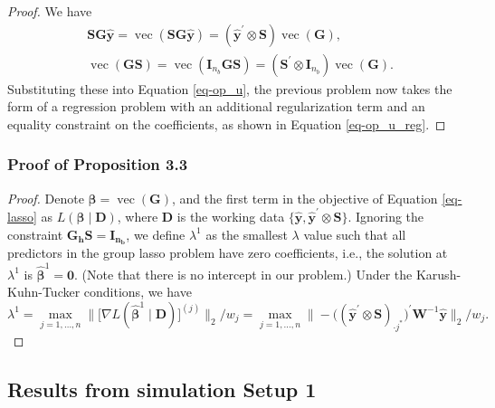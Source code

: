 \documentclass[
  11pt]{article}
\theoremstyle{plain}
\theoremstyle{remark}
\begin{document}
\begin{proof}
We have\vspace*{-0.4cm}\enlargethispage{0.4cm} \[
\begin{aligned}
& \bm{SG}\hat{\bm{y}} = \operatorname{vec}\left(\bm{SG}\hat{\bm{y}}\right) = \left(\hat{\bm{y}}^{\prime} \otimes \bm{S}\right) \operatorname{vec}(\bm{G}), \\
& \operatorname{vec}\left(\bm{G}\bm{S}\right) = \operatorname{vec}\left(\bm{I}_{n_b}\bm{G}\bm{S}\right) = \left(\bm{S}^{\prime} \otimes \bm{I}_{n_b}\right) \operatorname{vec}(\bm{G}).
\end{aligned}
\] Substituting these into Equation \eqref{eq-op_u}, the previous
problem now takes the form of a regression problem with an additional
regularization term and an equality constraint on the coefficients, as
shown in Equation \eqref{eq-op_u_reg}.
\end{proof}

\subsubsection{Proof of Proposition 3.3}\label{proof-of-proposition-3.3}

\begin{proof}
Denote \(\bm{\beta} = \operatorname{vec}(\bm{G})\), and the first term
in the objective of Equation \eqref{eq-lasso} as
\(L\left(\bm{\beta} \mid \bm{D}\right)\), where \(\bm{D}\) is the
working data
\(\{\hat{\bm{y}} , \hat{\bm{y}}^{\prime} \otimes \bm{S}\}\). Ignoring
the constraint \(\bm{G_h S}=\bm{I_{n_b}}\), we define \(\lambda^{1}\) as
the smallest \(\lambda\) value such that all predictors in the group
lasso problem have zero coefficients, i.e., the solution at
\(\lambda^{1}\) is \(\hat{\bm{\beta}}^{1}=\bm{0}\). (Note that there is
no intercept in our problem.) Under the Karush-Kuhn-Tucker conditions,
we have \[
\lambda^{1}
 = \max_{j=1, \ldots, n}\big\|\big[\nabla L(\hat{\bm{\beta}}^{1} \mid \bm{D})\big]^{(j)}\big\|_2 / w_j
 = \max_{j=1, \ldots, n}\big\|-\big((\hat{\bm{y}}^{\prime} \otimes \bm{S})_{\cdot j^{*}}\big)^{\prime} \bm{W}^{-1} \hat{\bm{y}}\big\|_2 / w_j.
\]
\end{proof}

\clearpage

\subsection{Results from simulation Setup 1}\label{appendix-sim1}
\end{document}

